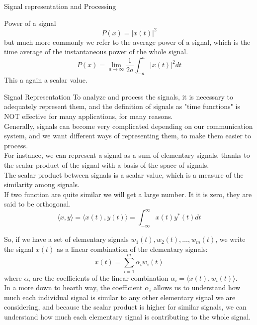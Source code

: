 \begin{section}{Signal representation and Processing}
\begin{subsection}{Power of a signal}
\begin{equation}
      P(x) = |x(t)|^2
    \end{equation}
    but much more commonly we refer to the average power of a signal, which is the time average of
    the instantaneous power of the whole signal.
    \begin{equation}
      P(x) = \lim_{a \to \infty} \frac{1}{2a} \int_{-a}^{a} |x(t)|^2 dt
    \end{equation}
    This a again a scalar value.
  \end{subsection}
  \begin{subsection}{Signal Representation}
    To analyze and process the signals, it is necessary to adequately represent them, and the
    definition of signals as "time functions" is NOT effective for many applications, for many 
    reasons.\\
    Generally, signals can become very complicated depending on our communication system, and
    we want different ways of representing them, to make them easier to process.\\
    For instance, we can represent a signal as a sum of elementary signals, thanks to the scalar
    product of the signal with a basis of the space of signals.\\

    The scalar product between signals is a scalar value, which is a measure of the similarity 
    among signals.\\
    If two function are quite similar we will get a large number.
    It it is zero, they are said to be orthogonal.
    \begin{equation}
      \langle x,y \rangle = \langle x(t),y(t) \rangle = \int_{-\infty}^{\infty} x(t)y^*(t) dt
    \end{equation}

    So, if we have a set of elementary signals $w_1(t), w_2(t), \dots, w_m(t)$, we write the signal
    $x(t)$ as a linear combination of the elementary signals:
    \begin{equation}
      x(t) = \sum_{i=1}^{m} \alpha_i w_i(t)
    \end{equation}
    where $\alpha_i$ are the coefficients of the linear combination $\alpha_i = \langle x(t), 
    w_i(t) \rangle$.\\
    In a more down to hearth way, the coefficient $\alpha_i$ allows us to understand how much each
    individual signal is similar to any other elementary signal we are considering, and because the 
    scalar product is higher for similar signals, we can understand how much each elementary signal
    is contributing to the whole signal.\\


\end{subsection}
\end{section}
